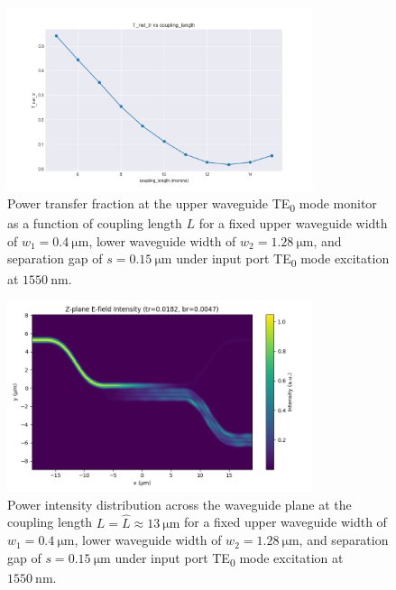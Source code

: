 \documentclass[10pt, a4paper]{article}
\begin{document}
\begin{figure}[h!]
  \centering
  \includegraphics[width=0.8\textwidth]{task3/sweep_plots/sweep_idx_8_sweep__coupling_length=5_15_11_wg1_width=0.4_wg2_width=1.28_separation=0.15_center_wavelength=1.55_T_net_tr_line.png}
  \caption{Power transfer fraction at the upper waveguide TE\textsubscript{0} mode monitor as a function of coupling length \(L\) for a fixed upper waveguide width of \(w_1=\SI{0.4}{\um}\), lower waveguide width of \(w_2=\SI{1.28}{\um}\), and separation gap of \(s=\SI{0.15}{\um}\) under input port TE\textsubscript{0} mode excitation at \(\SI{1550}{\nm}\).}
  \label{fig:te0_te2_coupling_length}
\end{figure}
\begin{figure}[h!]
  \centering
  \includegraphics[width=0.8\textwidth]{task3/sim_1521_130625/z_plane_intensity.png}
  \caption{Power intensity distribution across the waveguide plane at the coupling length \(L=\hat{L}\approx\SI{13}{\um}\) for a fixed upper waveguide width of \(w_1=\SI{0.4}{\um}\), lower waveguide width of \(w_2=\SI{1.28}{\um}\), and separation gap of \(s=\SI{0.15}{\um}\) under input port TE\textsubscript{0} mode excitation at \(\SI{1550}{\nm}\).}
  \label{fig:cross_mode_power_distribution}
\end{figure}
\end{document}
